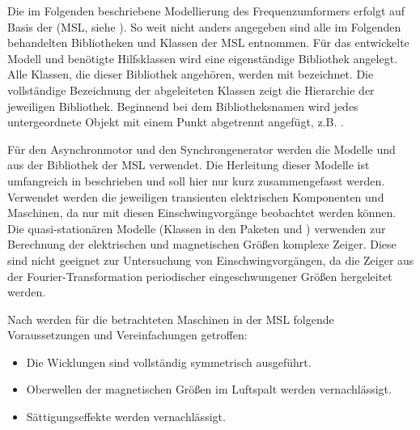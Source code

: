 Die im Folgenden beschriebene Modellierung des Frequenzumformers erfolgt auf Basis der  (MSL, siehe \cite[]{modelicaassociationModelicaStandardLibrary2020}). So weit nicht anders angegeben sind alle im Folgenden behandelten Bibliotheken und Klassen der MSL entnommen. Für das entwickelte Modell und benötigte Hilfsklassen wird eine eigenständige Bibliothek  angelegt. Alle Klassen, die dieser Bibliothek angehören, werden mit  bezeichnet. Die vollständige Bezeichnung der abgeleiteten Klassen zeigt die Hierarchie der jeweiligen Bibliothek. Beginnend bei dem Bibliotheksnamen wird jedes untergeordnete Objekt mit einem Punkt abgetrennt angefügt, z.B. .

Für den Asynchronmotor und den Synchrongenerator werden die Modelle  und  aus der Bibliothek  der MSL verwendet. Die Herleitung dieser Modelle ist umfangreich in \cite[]{kralModelicaObjektorientierteModellbildung2019} beschrieben und soll hier nur kurz zusammengefasst werden. Verwendet werden die jeweiligen transienten elektrischen Komponenten und Maschinen, da nur mit diesen Einschwingvorgänge beobachtet werden können. Die quasi-stationären Modelle (Klassen in den Paketen  und ) verwenden zur Berechnung der elektrischen und magnetischen Größen komplexe Zeiger. Diese sind nicht geeignet zur Untersuchung von Einschwingvorgängen, da die Zeiger aus der Fourier-Transformation periodischer eingeschwungener Größen hergeleitet werden.

Nach \cite[S. 149]{kralModelicaObjektorientierteModellbildung2019} werden für die betrachteten Maschinen in der MSL folgende Voraussetzungen und Vereinfachungen getroffen:
\begin{itemize}
	\item Die Wicklungen sind vollständig symmetrisch ausgeführt.
	\item Oberwellen der magnetischen Größen im Luftspalt werden vernachlässigt.
	\item Sättigungseffekte werden vernachlässigt.
\end{itemize}

